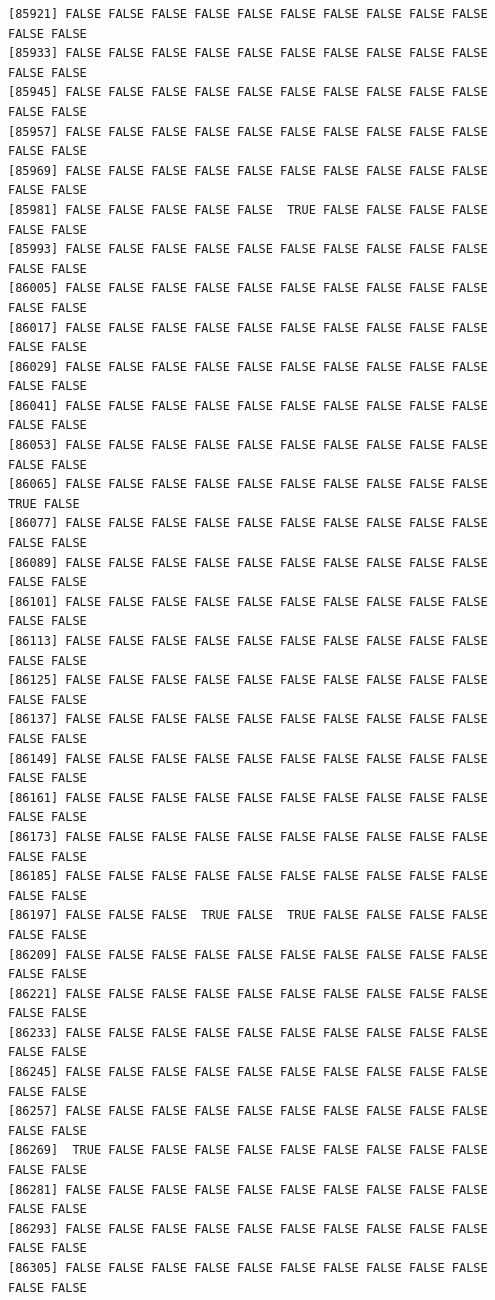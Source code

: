 \documentclass[
  a4paper,
  DIV=11,
  numbers=noendperiod]{scrartcl}
\begin{document}
\begin{verbatim}
[85921] FALSE FALSE FALSE FALSE FALSE FALSE FALSE FALSE FALSE FALSE FALSE FALSE
[85933] FALSE FALSE FALSE FALSE FALSE FALSE FALSE FALSE FALSE FALSE FALSE FALSE
[85945] FALSE FALSE FALSE FALSE FALSE FALSE FALSE FALSE FALSE FALSE FALSE FALSE
[85957] FALSE FALSE FALSE FALSE FALSE FALSE FALSE FALSE FALSE FALSE FALSE FALSE
[85969] FALSE FALSE FALSE FALSE FALSE FALSE FALSE FALSE FALSE FALSE FALSE FALSE
[85981] FALSE FALSE FALSE FALSE FALSE  TRUE FALSE FALSE FALSE FALSE FALSE FALSE
[85993] FALSE FALSE FALSE FALSE FALSE FALSE FALSE FALSE FALSE FALSE FALSE FALSE
[86005] FALSE FALSE FALSE FALSE FALSE FALSE FALSE FALSE FALSE FALSE FALSE FALSE
[86017] FALSE FALSE FALSE FALSE FALSE FALSE FALSE FALSE FALSE FALSE FALSE FALSE
[86029] FALSE FALSE FALSE FALSE FALSE FALSE FALSE FALSE FALSE FALSE FALSE FALSE
[86041] FALSE FALSE FALSE FALSE FALSE FALSE FALSE FALSE FALSE FALSE FALSE FALSE
[86053] FALSE FALSE FALSE FALSE FALSE FALSE FALSE FALSE FALSE FALSE FALSE FALSE
[86065] FALSE FALSE FALSE FALSE FALSE FALSE FALSE FALSE FALSE FALSE  TRUE FALSE
[86077] FALSE FALSE FALSE FALSE FALSE FALSE FALSE FALSE FALSE FALSE FALSE FALSE
[86089] FALSE FALSE FALSE FALSE FALSE FALSE FALSE FALSE FALSE FALSE FALSE FALSE
[86101] FALSE FALSE FALSE FALSE FALSE FALSE FALSE FALSE FALSE FALSE FALSE FALSE
[86113] FALSE FALSE FALSE FALSE FALSE FALSE FALSE FALSE FALSE FALSE FALSE FALSE
[86125] FALSE FALSE FALSE FALSE FALSE FALSE FALSE FALSE FALSE FALSE FALSE FALSE
[86137] FALSE FALSE FALSE FALSE FALSE FALSE FALSE FALSE FALSE FALSE FALSE FALSE
[86149] FALSE FALSE FALSE FALSE FALSE FALSE FALSE FALSE FALSE FALSE FALSE FALSE
[86161] FALSE FALSE FALSE FALSE FALSE FALSE FALSE FALSE FALSE FALSE FALSE FALSE
[86173] FALSE FALSE FALSE FALSE FALSE FALSE FALSE FALSE FALSE FALSE FALSE FALSE
[86185] FALSE FALSE FALSE FALSE FALSE FALSE FALSE FALSE FALSE FALSE FALSE FALSE
[86197] FALSE FALSE FALSE  TRUE FALSE  TRUE FALSE FALSE FALSE FALSE FALSE FALSE
[86209] FALSE FALSE FALSE FALSE FALSE FALSE FALSE FALSE FALSE FALSE FALSE FALSE
[86221] FALSE FALSE FALSE FALSE FALSE FALSE FALSE FALSE FALSE FALSE FALSE FALSE
[86233] FALSE FALSE FALSE FALSE FALSE FALSE FALSE FALSE FALSE FALSE FALSE FALSE
[86245] FALSE FALSE FALSE FALSE FALSE FALSE FALSE FALSE FALSE FALSE FALSE FALSE
[86257] FALSE FALSE FALSE FALSE FALSE FALSE FALSE FALSE FALSE FALSE FALSE FALSE
[86269]  TRUE FALSE FALSE FALSE FALSE FALSE FALSE FALSE FALSE FALSE FALSE FALSE
[86281] FALSE FALSE FALSE FALSE FALSE FALSE FALSE FALSE FALSE FALSE FALSE FALSE
[86293] FALSE FALSE FALSE FALSE FALSE FALSE FALSE FALSE FALSE FALSE FALSE FALSE
[86305] FALSE FALSE FALSE FALSE FALSE FALSE FALSE FALSE FALSE FALSE FALSE FALSE

\end{verbatim}
\end{document}

